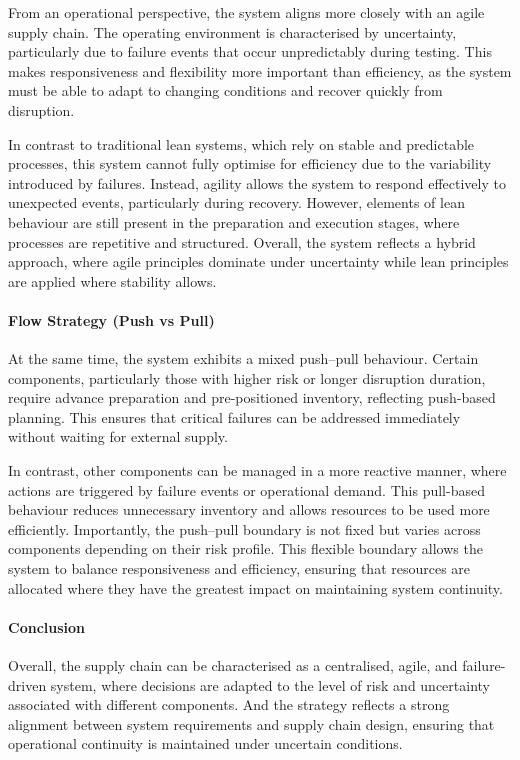 \documentclass[a4paper,11pt]{article}
\begin{document}
From an operational perspective, the system aligns more closely with an agile supply chain. The operating environment is characterised by uncertainty, particularly due to failure events that occur unpredictably during testing. This makes responsiveness and flexibility more important than efficiency, as the system must be able to adapt to changing conditions and recover quickly from disruption.

In contrast to traditional lean systems, which rely on stable and predictable processes, this system cannot fully optimise for efficiency due to the variability introduced by failures. Instead, agility allows the system to respond effectively to unexpected events, particularly during recovery. However, elements of lean behaviour are still present in the preparation and execution stages, where processes are repetitive and structured. Overall, the system reflects a hybrid approach, where agile principles dominate under uncertainty while lean principles are applied where stability allows.

\paragraph{Flow Strategy (Push vs Pull)}

At the same time, the system exhibits a mixed push--pull behaviour. Certain components, particularly those with higher risk or longer disruption duration, require advance preparation and pre-positioned inventory, reflecting push-based planning. This ensures that critical failures can be addressed immediately without waiting for external supply.

In contrast, other components can be managed in a more reactive manner, where actions are triggered by failure events or operational demand. This pull-based behaviour reduces unnecessary inventory and allows resources to be used more efficiently. Importantly, the push--pull boundary is not fixed but varies across components depending on their risk profile. This flexible boundary allows the system to balance responsiveness and efficiency, ensuring that resources are allocated where they have the greatest impact on maintaining system continuity.

\paragraph{Conclusion}

Overall, the supply chain can be characterised as a centralised, agile, and failure-driven system, where decisions are adapted to the level of risk and uncertainty associated with different components. And the strategy reflects a strong alignment between system requirements and supply chain design, ensuring that operational continuity is maintained under uncertain conditions.
\end{document}
